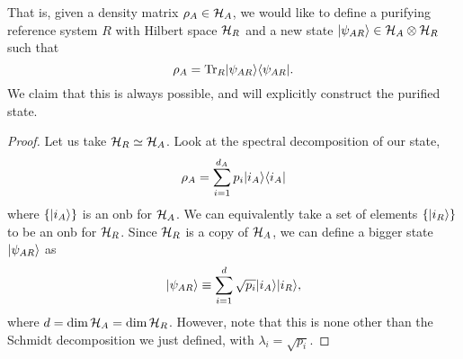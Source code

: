 That is, given a density matrix $\rho_A\in \mathcal H_A$, we would like to define a purifying reference system $R$ with Hilbert space $\mathcal H_R$ and a new state $\lvert\psi_{AR}\rangle\in \mathcal H_A \otimes \mathcal H_R$ such that
\begin{equation}
    \rho_A=\operatorname{Tr}_R \lvert\psi_{AR}\rangle\langle\psi_{AR}\rvert.
\end{equation}
We claim that this is always possible, and will explicitly construct the purified state.
\begin{proof}
    Let us take $\mathcal H_R \simeq \mathcal H_A$. Look at the spectral decomposition of our state,
    \begin{equation}
        \rho_A =\sum_{i=1}^{d_A} p_i \lvert i_A\rangle\langle i_A\rvert
    \end{equation}
    where $\{\lvert i_A\rangle\}$ is an onb for $\mathcal H_A$. We can equivalently take a set of elements $\{\lvert i_R\rangle\}$ to be an onb for $\mathcal H_R$. Since $\mathcal H_R$ is a copy of $\mathcal H_A$, we can define a bigger state $\lvert\psi_{AR}\rangle$ as
    \begin{equation}
        \lvert\psi_{AR}\rangle\equiv \sum_{i=1}^d \sqrt{p_i}\lvert i_A\rangle \lvert i_R\rangle,
    \end{equation}
    where $d=\dim \mathcal H_A = \dim \mathcal H_R$. However, note that this is none other than the Schmidt decomposition we just defined, with $\lambda_i=\sqrt{p_i}$.
    

\end{proof}
